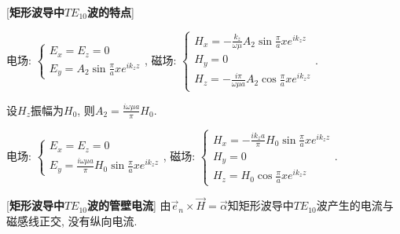 [\textbf{矩形波导中$TE_{10}$波的特点}]\par
\qquad 电场: $\begin{cases}E_x=E_z=0\\E_y=A_2\sin{\frac{\pi}{a}x}e^{ik_zz}\end{cases}$, 磁场: $\begin{cases}H_x=-\frac{k_z}{\omega\mu}A_2\sin{\frac{\pi}{a}x}e^{ik_zz}\\H_y=0\\H_z=-\frac{i\pi}{\omega\mu a}A_2\cos{\frac{\pi}{a}x}e^{ik_zz}\end{cases}$.\par
\qquad 设$H_z$振幅为$H_0$, 则$A_2=\frac{i\omega\mu a}{\pi}H_0$.\par
\qquad \qquad 电场: $\begin{cases}E_x=E_z=0\\E_y=\frac{i\omega\mu a}{\pi}H_0\sin{\frac{\pi}{a}x}e^{ik_zz}\end{cases}$, 磁场: $\begin{cases}H_x=-\frac{ik_za}{\pi}H_0\sin{\frac{\pi}{a}x}e^{ik_zz}\\H_y=0\\H_z=H_0\cos{\frac{\pi}{a}x}e^{ik_zz}\end{cases}$.\par

[\textbf{矩形波导中$TE_{10}$波的管壁电流}] 由$\vec e_n\times\vec H=\vec \alpha$知矩形波导中$TE_{10}$波产生的电流与磁感线正交, 没有纵向电流.\par




